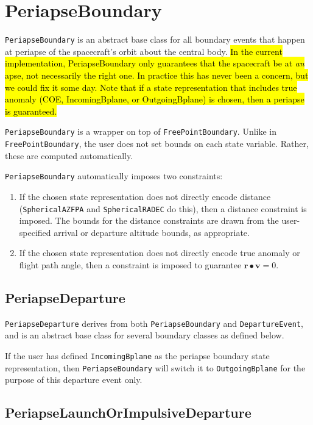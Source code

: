 \section{PeriapseBoundary}
\label{sec:periapseboundary}

\texttt{PeriapseBoundary} is an abstract base class for all boundary events that happen at periapse of the spacecraft's orbit about the central body. \hl{In the current implementation, PeriapseBoundary only guarantees that the spacecraft be at \textit{an} apse, not necessarily the right one. In practice this has never been a concern, but we could fix it some day. Note that if a state representation that includes true anomaly (COE, IncomingBplane, or OutgoingBplane) is chosen, then a periapse is guaranteed.}

\texttt{PeriapseBoundary} is a wrapper on top of \texttt{FreePointBoundary}. Unlike in \texttt{FreePointBoundary}, the user does not set bounds on each state variable. Rather, these are computed automatically.

\texttt{PeriapseBoundary} automatically imposes two constraints:
\begin{enumerate}
	\item If the chosen state representation does not directly encode distance (\texttt{SphericalAZFPA} and \texttt{SphericalRADEC} do this), then a distance constraint is imposed. The bounds for the distance constraints are drawn from the user-specified arrival or departure altitude bounds, as appropriate.
	\item If the chosen state representation does not directly encode true anomaly or flight path angle, then a constraint is imposed to guarantee $\mathbf{r} \bullet \mathbf{v} = 0$.
\end{enumerate}

\subsection{PeriapseDeparture}
\label{subsec:PeriapseDeparture}

\texttt{PeriapseDeparture} derives from both \texttt{PeriapseBoundary} and \texttt{DepartureEvent}, and is an abstract base class for several boundary classes as defined below.

If the user has defined \texttt{IncomingBplane} as the periapse boundary state representation, then \texttt{PeriapseBoundary} will switch it to \texttt{OutgoingBplane} for the purpose of this departure event only.

\subsection{PeriapseLaunchOrImpulsiveDeparture}
\label{subsec:PeriapseLaunchOrImpulsiveDeparture}


